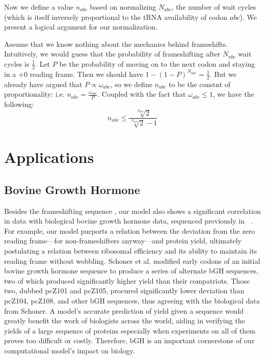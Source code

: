 \documentclass[12pt, draft]{article}
\begin{document}
Now we define a value $n_{abc}$ based on normalizing $N_{abc}$, the number of wait cycles (which is itself inversely proportional to the tRNA availability of codon $abc$).  We present a logical argument for our normalization.

Assume that we know nothing about the mechanics behind frameshifts.  Intuitively, we would guess that the probability of frameshifting after $N_{abc}$ wait cycles is $\frac{1}{2}$.  Let $P$ be the probability of moving on to the next codon and staying in a +0 reading frame.  Then we should have $1-\left(1-P\right)^{N_{abc}} = \frac{1}{2}$.  But we already have argued that $P \propto \omega_{abc}$, so we define $n_{abc}$ to be the constnt of proportionality: i.e. $n_{abc} = \frac{\omega_{abc}}{P}$.  Coupled with the fact that $\omega_{abc} \le 1$, we have the following: $$n_{abc} \le \frac{\sqrt[N_{abc}]{2}}{\sqrt[N_{abc}]{2} - 1}$$




\section{Applications}

\subsection{Bovine Growth Hormone}
Besides the frameshifting sequence \prfB, our model also shows a significant correlation in data with biological
bovine growth hormone data, sequenced previously in \ecoli~\cite{schoner:bgh}. For example, our model purports a relation
between the deviation from the zero reading frame---for non-frameshifters anyway---and protein yield, ultimately postulating
a relation between ribosomal efficiency and its ability to maintain its reading frame without wobbling. Schoner et al.
modified early codons of an initial bovine growth hormone sequence to produce a series of alternate bGH sequences,
two of which produced significantly higher yield than their compatriots. Those two, dubbed pcZ101 and pcZ105, procured significantly
lower deviation than pcZ104, pcZ108, and other bGH sequences, thus agreeing with the biological data from Schoner.
A model's accurate prediction of yield given a sequence would greatly benefit the work of biologists across the world,
aiding in verifying the yields of a large sequence of proteins especially when experiments on all of them proves too difficult
or costly. Therefore, bGH is an important cornerstone of our computational model's impact on biology.
\end{document}
